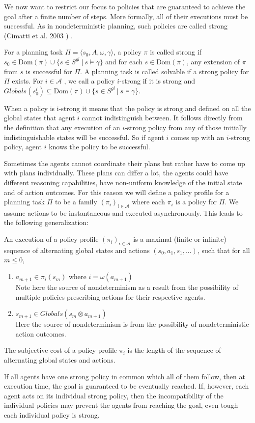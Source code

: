 We now want to restrict our focus to policies that are guaranteed to achieve the goal after a finite number of steps. More formally, all of their executions must be successful. As in nondeterministic planning, such policies are called strong (Cimatti et al. 2003 \cite{cimattietal}) .

For a planning task $\Pi = \langle s_0, A, \omega, \gamma \rangle$, a policy $\pi$ is called strong if $s_0 \in \text{Dom}(\pi) \cup \{s \in S^{gl} ~|~ s \models \gamma\}$ and for each $s \in \text{Dom}(\pi)$, any extension of $\pi$ from $s$ is successful for $\Pi$. A planning task is called solvable if a strong policy for $\Pi$ exists.
For $ i \in \mathcal{A} $ , we call a policy $i$-strong if it is strong and  $Globals(s_0^i ) \subseteq \text{Dom}(\pi) \cup\{ s \in S^{gl} ~|~ s \models \gamma \}$.

When a policy is i-strong it means that the policy is strong and defined on all the global states that agent $i$ cannot indistinguish between. It follows directly from the definition that any execution of an $i$-strong policy from any of those initially indistinguishable states will be successful. So if agent $i$ comes up with an $i$-strong policy, agent $i$ knows the policy to be successful.

Sometimes the agents cannot coordinate their plans but rather have to come up with plans individually. These plans can differ a lot, the agents could have different reasoning capabilities, have non-uniform knowledge of the initial state and of action outcomes. For this reason we will define a policy profile for a planning task $\Pi$ to be a family $(\pi_i)_{i \in \mathcal{A}}$ where each $\pi_i$ is a policy for $\Pi$. We assume actions to be instantaneous and executed asynchronously. This leads to the following generalization:

An execution of a policy profile $(\pi_i)_{i \in \mathcal{A}}$ is a maximal (finite or infinite) sequence of alternating global states and actions $(s_0, a_1, s_1,...)$, such that for all $m \leq 0$,
\begin{enumerate}
  \item $a_{m+1} \in \pi_i(s_m)$ where $i=\omega(a_{m+1})$ \\
    Note here the source of nondeterminism as a result from the possibility of multiple policies prescribing actions for their respective agents.
  \item $s_{m+1} \in Globals(s_m \otimes a_{m+1}) $ \\
    Here the source of nondeterminism is from the possibility of nondeterministic action outcomes.
\end{enumerate}

The subjective cost of a policy profile $\pi_i$ is the length of the sequence of alternating global states and actions.


If all agents have one strong policy in common which all of them follow, then at execution time, the goal is guaranteed to be eventually reached. If, however, each agent acts on its individual strong policy, then the incompatibility of the individual policies may prevent the agents from reaching the goal, even tough each individual policy is strong.
